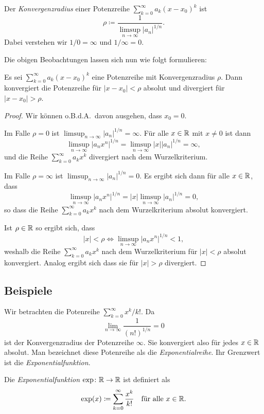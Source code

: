 \documentclass[a4paper,10pt]{article}
\begin{document}
\begin{defi}
 Der \emph{Konvergenzradius} einer Potenzreihe $\sum_{k=0}^\infty a_k (x-x_0)^k$ ist
 \[
  \rho \coloneqq \frac{1}{\limsup_{n \to \infty} |a_n|^{1/n}}.
 \]
 Dabei verstehen wir $1/0 = \infty$ und $1/\infty = 0$.
\end{defi}


Die obigen Beobachtungen lassen sich nun wie folgt formulieren:


\begin{prop}
 Es sei $\sum_{k=0}^\infty a_k (x-x_0)^k$ eine Potenzreihe mit Konvergenzradius $\rho$. Dann konvergiert die Potenzreihe für $|x-x_0| < \rho$ absolut und divergiert für $|x-x_0| > \rho$.
\end{prop}
\begin{proof}
 Wir können o.B.d.A.\ davon ausgehen, dass $x_0 = 0$.
 
 Im Falle $\rho = 0$ ist $\limsup_{n \to \infty} |a_n|^{1/n} = \infty$. Für alle $x \in \mathbb{R}$ mit $x \neq 0$ ist dann
 \[
  \limsup_{n \to \infty} |a_n x^n|^{1/n}
  = \limsup_{n \to \infty} |x| |a_n|^{1/n}
  = \infty,
 \]
 und die Reihe $\sum_{k=0}^\infty a_k x^k$ divergiert nach dem Wurzelkriterium.
 
 Im Falle $\rho = \infty$ ist $\limsup_{n \to \infty} |a_n|^{1/n} = 0$. Es ergibt sich dann für alle $x \in \mathbb{R}$, dass
 \[
  \limsup_{n \to \infty} |a_n x^n|^{1/n}
  = |x| \limsup_{n \to \infty} |a_n|^{1/n}
  = 0,
 \]
 so dass die Reihe $\sum_{k=0}^\infty a_k x^k$ nach dem Wurzelkriterium absolut konvergiert.
 
 Ist $\rho \in \mathbb{R}$ so ergibt sich, dass
 \[
  |x| < \rho
  \Leftrightarrow
  \limsup_{n \to \infty} |a_n x^n|^{1/n} < 1,
 \]
 weshalb die Reihe $\sum_{k=0}^\infty a_k x^k$ nach dem Wurzelkriterium für $|x| < \rho$ absolut konvergiert. Analog ergibt sich dass sie für $|x| > \rho$ divergiert.
\end{proof}


\subsection{Beispiele}


Wir betrachten die Potenreihe $\sum_{k=0}^\infty x^k/k!$. Da
\[
 \lim_{n \to \infty} \frac{1}{(n!)^{1/n}}
 = 0
\]
ist der Konvergenzradius der Potenzreihe $\infty$. Sie konvergiert also für jedes $x \in \mathbb{R}$ absolut. Man bezeichnet diese Potenreihe als die \emph{Exponentialreihe}. Ihr Grenzwert ist die \emph{Exponentialfunktion}.


\begin{defi}
 Die \emph{Exponentialfunktion} $\exp \colon \mathbb{R} \to \mathbb{R}$ ist definiert als
 \[
  \exp(x) \coloneqq \sum_{k=0}^\infty \frac{x^k}{k!} \quad \text{für alle $x \in \mathbb{R}$}.
 \]
\end{defi}
\end{document}
